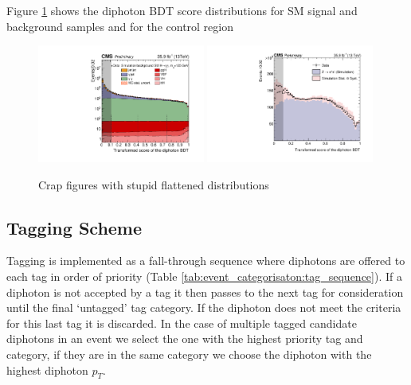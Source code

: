 Figure \ref{fig:event_categorisaton:diphoton_bdt} shows the diphoton BDT score distributions for SM signal and background samples and for the \Zee control region
\begin{figure}[h!]
    \begin{center}
        \includegraphics[width=0.49\textwidth]{figures/event_selection/Figure_005-a.pdf}
        \includegraphics[width=0.49\textwidth]{figures/event_selection/Figure_005-b.pdf}
    \end{center}
    \caption{Crap figures with stupid flattened distributions}
        \label{fig:event_categorisaton:diphoton_bdt}
\end{figure}


\subsection{Tagging Scheme}
Tagging is implemented as a fall-through sequence where diphotons are offered to each tag in order of priority (Table \ref{tab:event_categorisaton:tag_sequence}). 
If a diphoton is not accepted by a tag it then passes to the next tag for consideration until the final `untagged' tag category. 
If the diphoton does not meet the criteria for this last tag it is discarded.
In the case of multiple tagged candidate diphotons in an event we select the one with the highest priority tag and category, if they are in the same category we choose the diphoton with the highest diphoton $p_{T}$.

